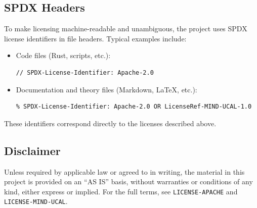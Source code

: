\subsection*{SPDX Headers}

To make licensing machine-readable and unambiguous, the project uses SPDX
license identifiers in file headers. Typical examples include:

\begin{itemize}
  \item Code files (Rust, scripts, etc.):
\begin{verbatim}
// SPDX-License-Identifier: Apache-2.0
\end{verbatim}

  \item Documentation and theory files (Markdown, LaTeX, etc.):
\begin{verbatim}
% SPDX-License-Identifier: Apache-2.0 OR LicenseRef-MIND-UCAL-1.0
\end{verbatim}
\end{itemize}

These identifiers correspond directly to the licenses described above.

\subsection*{Disclaimer}

Unless required by applicable law or agreed to in writing, the material in this
project is provided on an ``AS IS'' basis, without warranties or conditions of
any kind, either express or implied. For the full terms, see
\texttt{LICENSE-APACHE} and \texttt{LICENSE-MIND-UCAL}.
